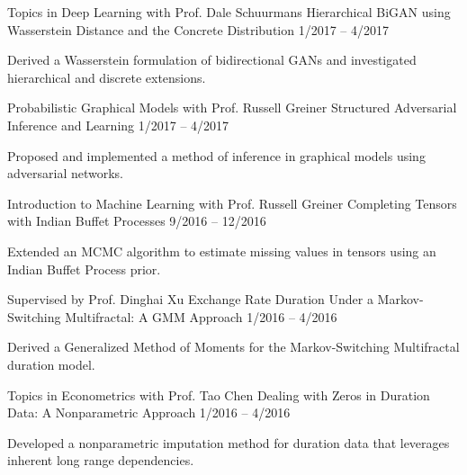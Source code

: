 \begin{cventries}
  \cventry
    {Topics in Deep Learning with Prof. Dale Schuurmans}
    {Hierarchical BiGAN using Wasserstein Distance and
the Concrete Distribution}
    {1/2017 -- 4/2017}
    {
      \begin{cvitems}
        \item Derived a Wasserstein formulation of bidirectional GANs and investigated hierarchical and discrete extensions.
      \end{cvitems}
    }
  \cventry
    {Probabilistic Graphical Models with Prof. Russell Greiner}
    {Structured Adversarial Inference and Learning}
    {1/2017 -- 4/2017}
    {
      \begin{cvitems}
        \item Proposed and implemented a method of inference in graphical models using adversarial networks.
      \end{cvitems}
    }
  \cventry
    {Introduction to Machine Learning with Prof. Russell Greiner}
    {Completing Tensors with Indian Buffet Processes}
    {9/2016 -- 12/2016}
    {
      \begin{cvitems}
		\item Extended an MCMC algorithm to estimate missing values in tensors using an Indian Buffet Process prior.
      \end{cvitems}
    }
  \cventry
    {Supervised by Prof. Dinghai Xu}
    {Exchange Rate Duration Under a Markov-Switching Multifractal: A GMM Approach}
    {1/2016 -- 4/2016}
    {
      \begin{cvitems}
      	\item Derived a Generalized Method of Moments for the Markov-Switching Multifractal duration model.
      \end{cvitems}
    }
  \cventry
    {Topics in Econometrics with Prof. Tao Chen}
    {Dealing with Zeros in Duration Data: A Nonparametric Approach}
    {1/2016 -- 4/2016}
    {
      \begin{cvitems}
        \item Developed a nonparametric imputation method for duration data that leverages inherent long range dependencies.
      \end{cvitems}
    }
\end{cventries}

